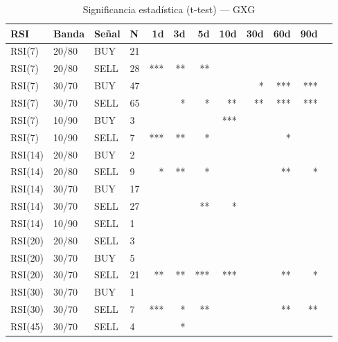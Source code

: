 %
\begin{table}[htbp]
    \centering
    \caption{Significancia estadística (t-test) --- GXG}
    \label{tab:sig_gxg}
    \small
    \begin{tabular}{llllrrrrrrrr}
        \toprule
        \textbf{RSI} & \textbf{Banda} & \textbf{Se\~{n}al} & \textbf{N} & \textbf{1d} & \textbf{3d} & \textbf{5d} & \textbf{10d} & \textbf{30d} & \textbf{60d} & \textbf{90d} \\
        \midrule
        RSI(7) & 20/80 & BUY & 21 &  &  &  &  &  &  &  \\
        RSI(7) & 20/80 & SELL & 28 & *** & ** & ** &  &  &  &  \\
        RSI(7) & 30/70 & BUY & 47 &  &  &  &  & * & *** & *** \\
        RSI(7) & 30/70 & SELL & 65 &  & * & * & ** & ** & *** & *** \\
        RSI(7) & 10/90 & BUY & 3 &  &  &  & *** &  &  &  \\
        RSI(7) & 10/90 & SELL & 7 & *** & ** & * &  &  & * &  \\
        \midrule
        RSI(14) & 20/80 & BUY & 2 &  &  &  &  &  &  &  \\
        RSI(14) & 20/80 & SELL & 9 & * & ** & * &  &  & ** & * \\
        RSI(14) & 30/70 & BUY & 17 &  &  &  &  &  &  &  \\
        RSI(14) & 30/70 & SELL & 27 &  &  & ** & * &  &  &  \\
        RSI(14) & 10/90 & SELL & 1 &  &  &  &  &  &  &  \\
        \midrule
        RSI(20) & 20/80 & SELL & 3 &  &  &  &  &  &  &  \\
        RSI(20) & 30/70 & BUY & 5 &  &  &  &  &  &  &  \\
        RSI(20) & 30/70 & SELL & 21 & ** & ** & *** & *** &  & ** & * \\
        \midrule
        RSI(30) & 30/70 & BUY & 1 &  &  &  &  &  &  &  \\
        RSI(30) & 30/70 & SELL & 7 & *** & * & ** &  &  & ** & ** \\
        \midrule
        RSI(45) & 30/70 & SELL & 4 &  & * &  &  &  &  &  \\
        \bottomrule
    \end{tabular}
\end{table}
